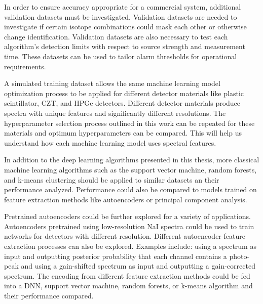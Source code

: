 In order to ensure accuracy appropriate for a commercial system, additional validation datasets must be investigated. Validation datasets are needed to investigate if certain isotope combinations could mask each other or otherwise change identification. Validation datasets are also necessary to test each algorithm's detection limits with respect to source strength and measurement time. These datasets can be used to tailor alarm thresholds for operational requirements. 

A simulated training dataset allows the same machine learning model optimization process to be applied for different detector materials like plastic scintillator, CZT, and HPGe detectors. Different detector materials produce spectra with unique features and significantly different resolutions. The hyperparameter selection process outlined in this work can be repeated for these materials and optimum hyperparameters can be compared. This will help us understand how each machine learning model uses spectral features.

In addition to the deep learning algorithms presented in this thesis, more classical machine learning algorithms such as the support vector machine, random forests, and k-means clustering should be applied to similar datasets an their performance analyzed. Performance could also be compared to models trained on feature extraction methods like autoencoders or principal component analysis.

Pretrained autoencoders could be further explored for a variety of applications. Autoencoders pretrained using low-resolution NaI spectra could be used to train networks for detectors with different resolution. Different autoencoder feature extraction processes can also be explored. Examples include: using a spectrum as input and outputting posterior probability that each channel contains a photo-peak and using a gain-shifted spectrum as input and outputting a gain-corrected spectrum. The encoding from different feature extraction methods could be fed into a DNN, support vector machine, random forests, or k-means algorithm and their performance compared.






